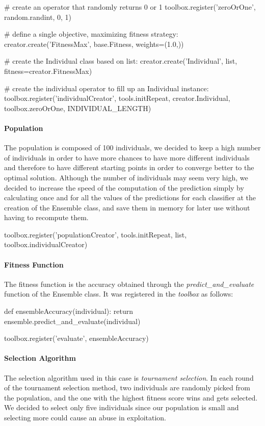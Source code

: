 \begin{python}
# create an operator that randomly returns 0 or 1
toolbox.register('zeroOrOne', random.randint, 0, 1)

# define a single objective, maximizing fitness strategy:
creator.create('FitnessMax', base.Fitness, weights=(1.0,))

# create the Individual class based on list:
creator.create('Individual', list, fitness=creator.FitnessMax)

# create the individual operator to fill up an Individual instance:
toolbox.register('individualCreator', tools.initRepeat, creator.Individual, toolbox.zeroOrOne, INDIVIDUAL_LENGTH)
\end{python}

\paragraph{Population}
The population is composed of 100 individuals, we decided to keep a high number of individuals in order to have more chances to have more different individuals and therefore to have different starting points in order to converge better to the optimal solution. Although the number of individuals may seem very high, we decided to increase the speed of the computation of the prediction simply by calculating once and for all the values of the predictions for each classifier at the creation of the Ensemble class, and save them in memory for later use without having to recompute them.

\begin{python}
toolbox.register('populationCreator', tools.initRepeat, list, toolbox.individualCreator)
\end{python}

\paragraph{Fitness Function}
The fitness function is the accuracy obtained through the \textit{predict\_and\_evaluate} function of the Ensemble class. It was registered in the \textit{toolbox} as follows:

\begin{python}
def ensembleAccuracy(individual):
    return ensemble.predict_and_evaluate(individual)

toolbox.register('evaluate', ensembleAccuracy)
\end{python}

\paragraph{Selection Algorithm}
The selection algorithm used in this case is \textit{tournament selection}. In each round of the tournament selection method, two individuals are randomly picked from the population, and the one with the highest fitness score wins and gets selected. We decided to select only five individuals since our population is small and selecting more could cause an abuse in exploitation.


